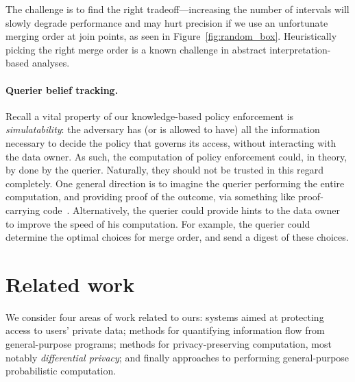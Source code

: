 The challenge is to find the right tradeoff---increasing the number of
intervals will slowly degrade performance and may hurt precision if we
use an unfortunate merging order at join points, as seen in
Figure~\ref{fig:random_box}.  Heuristically picking the right merge
order is a known challenge in abstract interpretation-based analyses.

\paragraph*{Querier belief tracking.} 

Recall a vital property of our knowledge-based policy enforcement is
\emph{simulatability}: the adversary has (or is allowed to have) all
the information necessary to decide the policy that governs its
access, without interacting with the data owner. As such, the
computation of policy enforcement could, in theory, by done by the
querier.  Naturally, they should not be trusted in this regard
completely.  One general direction is to imagine the querier
performing the entire computation, and providing proof of the outcome,
via something like proof-carrying
code~\cite{necula97pcc}. Alternatively, the querier could provide
hints to the data owner to improve the speed of his computation.  For
example, the querier could determine the optimal choices for merge
order, and send a digest of these choices.

\section{Related work} \label{sec:related}
We consider four areas of work related to ours: systems aimed at
protecting access to users' private data; methods for quantifying
information flow from general-purpose programs; methods for
privacy-preserving computation, most notably \emph{differential
  privacy}; and finally approaches to performing general-purpose
probabilistic computation.

